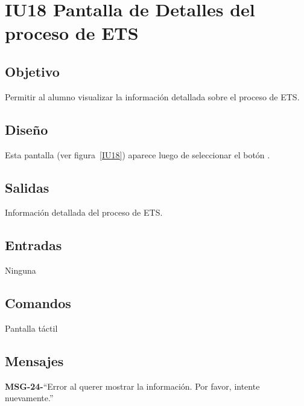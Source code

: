\section{IU18 Pantalla de Detalles del proceso de ETS}

\subsection{Objetivo}
Permitir al alumno visualizar la información detallada sobre el proceso de ETS.

\subsection{Diseño}
Esta pantalla  (ver figura~\ref{IU18}) aparece luego de seleccionar el botón . 


\subsection{Salidas}

Información detallada del proceso de ETS. 

\subsection{Entradas}
Ninguna


\subsection{Comandos}
Pantalla táctil


\subsection{Mensajes}

\begin{Citemize}
	\item {\bf MSG-24-}{``Error al querer mostrar la información. Por favor, intente nuevamente.''}
\end{Citemize}


